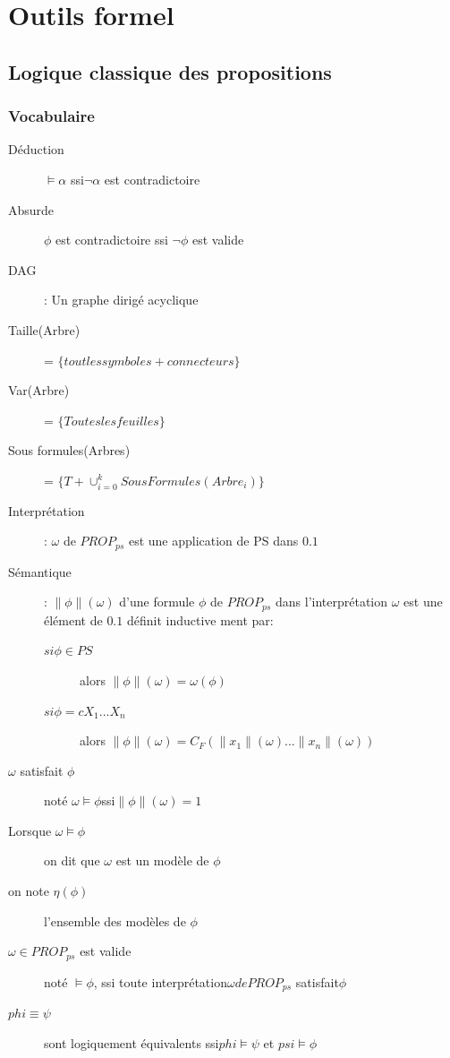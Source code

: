 \part{Outils formel}
\pagebreak

\chapter{Logique classique des propositions}
\section{Vocabulaire}

\begin{description}
\item[Déduction] $\models \alpha$ ssi$ \neg \alpha$ est contradictoire
\item[Absurde] $\phi$ est contradictoire ssi $\neg \phi$ est valide
\item[DAG]: Un graphe dirigé acyclique
\item[Taille(Arbre)] = $\{ tout les symboles + connecteurs \}$
\item[Var(Arbre)] = $\{ Toutes les feuilles \}$
\item[Sous formules(Arbres)] = $\{ T + \cup_{i=0}^k SousFormules(Arbre_i) \}$
\item[Interprétation]: $\omega$ de $PROP_{ps}$ est une application de PS dans ${0.1}$
\item[Sémantique]: $\|  \phi \| (\omega)$ d'une formule $\phi$ de $PROP_{ps}$ dans l'interprétation $\omega$ est une élément de ${0.1}$ définit inductive ment par:
\begin{description}
\item[$si \phi \in PS$] alors $\| \phi \| (\omega) = \omega(\phi)$
\item[$si \phi = cX_1 ... X_n$] alors $\| \phi \|(\omega) = C_F(\| x_1 \| (\omega) ... \| x_n \|(\omega))$
\end{description}
\item[$\omega $ satisfait $ \phi$] noté $\omega \models \phi $ssi$ \| \phi \| (\omega) = 1$
\item[Lorsque $\omega \models \phi$] on dit que $\omega$ est un modèle de $\phi$
\item[on note $\eta(\phi)$] l'ensemble des modèles de $\phi$
\item[$\omega \in PROP_{ps}$ est valide] noté $\models \phi$, ssi toute interprétation$ \omega de PROP_{ps}$ satisfait$ \phi$
\item[$phi \equiv \psi$] sont logiquement équivalents ssi$ phi \models \psi$ et $psi \models \phi$
\end{description}

